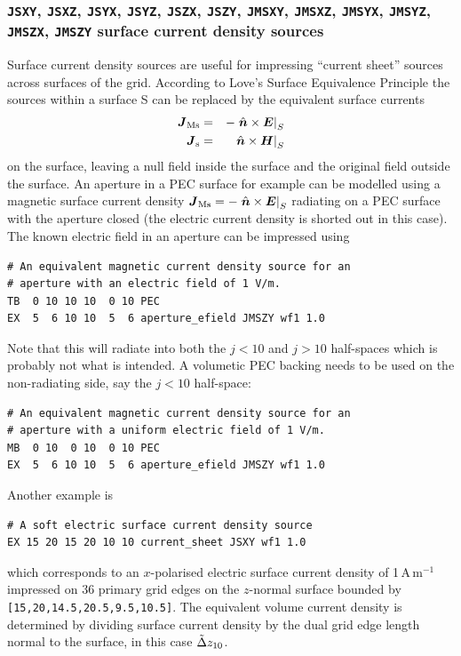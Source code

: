 \documentclass[onecolumn,a4paper]{article}
\numberwithin{equation}{section}
\begin{document}
\subsubsection{\texttt{JSXY}, \texttt{JSXZ}, \texttt{JSYX}, \texttt{JSYZ}, \texttt{JSZX}, \texttt{JSZY},
\texttt{JMSXY}, \texttt{JMSXZ}, \texttt{JMSYX}, \texttt{JMSYZ}, \texttt{JMSZX}, \texttt{JMSZY} surface current density sources}
\label{sc:softsurfcur}

Surface current density sources are useful for impressing ``current sheet'' sources across surfaces of the grid. 
According to Love's Surface Equivalence Principle the sources within a surface
S can be replaced by the equivalent surface currents 
\begin{eqnarray}
\boldsymbol{J}_\mathrm{Ms} &=& -\left. \hat{\boldsymbol{n}} \times \boldsymbol{E} \right|_S \\
\boldsymbol{J}_\mathrm{s}  &=&  \left. \hat{\boldsymbol{n}} \times \boldsymbol{H} \right|_S
\end{eqnarray}
on the surface, leaving a null field inside the surface and the original
field outside the surface. An aperture in a PEC surface for 
example can be modelled using a magnetic surface current density 
$\boldsymbol{J}_\mathrm{Ms} = -\left. \hat{\boldsymbol{n}} \times \boldsymbol{E} \right|_S$
radiating on a PEC surface with the aperture closed (the electric current
density is shorted out in this case). The known electric
field in an aperture can be impressed using
\begin{verbatim}
# An equivalent magnetic current density source for an
# aperture with an electric field of 1 V/m.
TB  0 10 10 10  0 10 PEC
EX  5  6 10 10  5  6 aperture_efield JMSZY wf1 1.0
\end{verbatim}
Note that this will radiate into both the $j<10$ and $j>10$ half-spaces which is 
probably not what is intended. A volumetic PEC backing needs to be used on the 
non-radiating side, say the $j<10$ half-space:
\begin{verbatim}
# An equivalent magnetic current density source for an
# aperture with a uniform electric field of 1 V/m.
MB  0 10  0 10  0 10 PEC
EX  5  6 10 10  5  6 aperture_efield JMSZY wf1 1.0
\end{verbatim}

Another example is
\begin{verbatim}
# A soft electric surface current density source
EX 15 20 15 20 10 10 current_sheet JSXY wf1 1.0
\end{verbatim}
which corresponds to an $x$-polarised electric surface current density of 1\,A\,m$^{-1}$ impressed on 36 primary
grid edges on the $z$-normal surface bounded by \texttt{[15,20,14.5,20.5,9.5,10.5]}. The equivalent volume current density
is determined by dividing surface current density by the dual grid edge length normal to the surface, 
in this case $\tilde{\Delta} z_{10}$.
\end{document}
